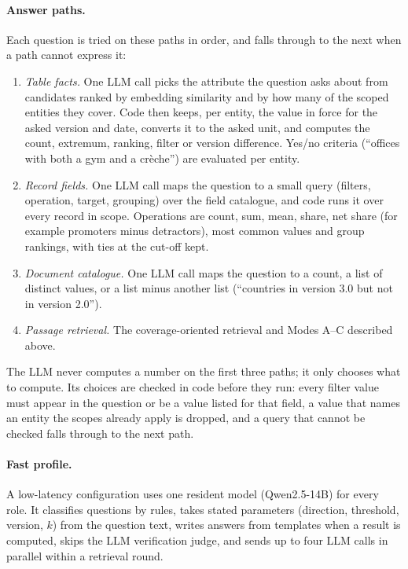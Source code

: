 \documentclass[11pt,letterpaper,oneside]{report}
\begin{document}
\paragraph{Answer paths.}
Each question is tried on these paths in order, and falls through to the
next when a path cannot express it:
\begin{enumerate}
  \item \emph{Table facts.} One LLM call picks the attribute the question
  asks about from candidates ranked by embedding similarity and by how many
  of the scoped entities they cover. Code then keeps, per entity, the value
  in force for the asked version and date, converts it to the asked unit,
  and computes the count, extremum, ranking, filter or version difference.
  Yes/no criteria (``offices with both a gym and a crèche'') are evaluated
  per entity.
  \item \emph{Record fields.} One LLM call maps the question to a small
  query (filters, operation, target, grouping) over the field catalogue,
  and code runs it over every record in scope. Operations are count, sum,
  mean, share, net share (for example promoters minus detractors), most
  common values and group rankings, with ties at the cut-off kept.
  \item \emph{Document catalogue.} One LLM call maps the question to a
  count, a list of distinct values, or a list minus another list
  (``countries in version 3.0 but not in version 2.0'').
  \item \emph{Passage retrieval.} The coverage-oriented retrieval and Modes
  A--C described above.
\end{enumerate}
The LLM never computes a number on the first three paths; it only chooses
what to compute. Its choices are checked in code before they run: every
filter value must appear in the question or be a value listed for that
field, a value that names an entity the scopes already apply is dropped,
and a query that cannot be checked falls through to the next path.

\paragraph{Fast profile.}
A low-latency configuration uses one resident model (Qwen2.5-14B) for every
role. It classifies questions by rules, takes stated parameters (direction,
threshold, version, $k$) from the question text, writes answers from
templates when a result is computed, skips the LLM verification judge, and
sends up to four LLM calls in parallel within a retrieval round.
\end{document}
